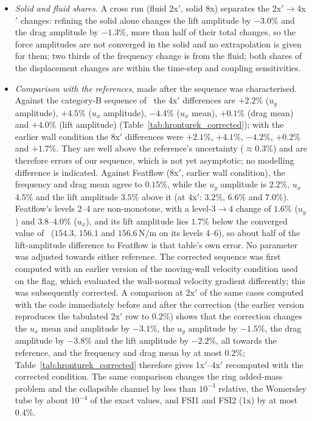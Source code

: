 \begin{itemize}
	\item \emph{Solid and fluid shares.} A cross run (fluid 2x$'$, solid 8x) separates the 2x$'\to$4x$'$ changes: refining the solid alone changes the lift amplitude by $-3.0\%$ and the drag amplitude by $-1.3\%$, more than half of their total changes, so the force amplitudes are not converged in the solid and no extrapolation is given for them; two thirds of the frequency change is from the fluid; both shares of the displacement changes are within the time-step and coupling sensitivities.
	\item \emph{Comparison with the references}, made after the sequence was characterised. Against the category-B sequence of~\citet{Failer2020} the 4x$'$ differences are $+2.2\%$ ($u_y$ amplitude), $+4.5\%$ ($u_x$ amplitude), $-4.4\%$ ($u_x$ mean), $+0.1\%$ (drag mean) and $+4.0\%$ (lift amplitude) (Table~\ref{tab:hronturek_corrected}); with the earlier wall condition the 8x$'$ differences were $+2.1\%$, $+4.1\%$, $-4.2\%$, $+0.2\%$ and $+1.7\%$. They are well above the reference's uncertainty ($\approx0.3\%$) and are therefore errors of our sequence, which is not yet asymptotic; no modelling difference is indicated. Against Featflow (8x$'$, earlier wall condition), the frequency and drag mean agree to $0.15\%$, while the $u_y$ amplitude is $2.2\%$, $u_x$ $4.5\%$ and the lift amplitude $3.5\%$ above it (at 4x$'$: $3.2\%$, $6.6\%$ and $7.0\%$). Featflow's levels 2--4 are non-monotone, with a level-3$\to$4 change of $1.6\%$ ($u_y$) and $3.8$--$4.0\%$ ($u_x$), and its lift amplitude lies $1.7\%$ below the converged value of~\citet{Failer2020} ($154.3$, $156.1$ and $156.6\,\mathrm{N/m}$ on its levels 4--6), so about half of the lift-amplitude difference to Featflow is that table's own error. No parameter was adjusted towards either reference. The corrected sequence was first computed with an earlier version of the moving-wall velocity condition used on the flag, which evaluated the wall-normal velocity gradient differently; this was subsequently corrected. A comparison at 2x$'$ of the same cases computed with the code immediately before and after the correction (the earlier version reproduces the tabulated 2x$'$ row to $0.2\%$) shows that the correction changes the $u_x$ mean and amplitude by $-3.1\%$, the $u_y$ amplitude by $-1.5\%$, the drag amplitude by $-3.8\%$ and the lift amplitude by $-2.2\%$, all towards the reference, and the frequency and drag mean by at most $0.2\%$; Table~\ref{tab:hronturek_corrected} therefore gives 1x$'$--4x$'$ recomputed with the corrected condition. The same comparison changes the ring added-mass problem and the collapsible channel by less than $10^{-3}$ relative, the Womersley tube by about $10^{-4}$ of the exact values, and FSI1 and FSI2 (1x) by at most $0.4\%$.
\end{itemize}
